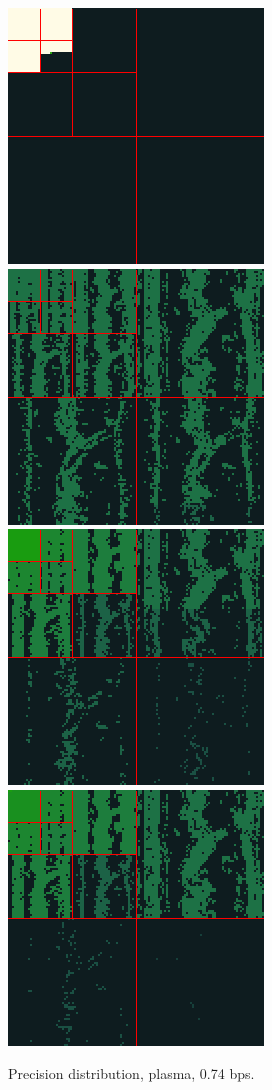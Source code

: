 \begin{figure}[h]
	\centering
	{\includegraphics[width=0.24\linewidth]{img/rmse/rmse-precision-dist-by-level.png}}
	{\includegraphics[width=0.24\linewidth]{img/rmse/rmse-precision-by-bit-plane.png}}
	{\includegraphics[width=0.24\linewidth]{img/rmse/rmse-precision-dist-by-wavelet-norm.png}}
	{\includegraphics[width=0.24\linewidth]{img/rmse/rmse-precision-signature.png}}
	
	\caption{Precision distribution, plasma, 0.74 bps.}
 	\label{fig:rmse-rendering}
\end{figure}
